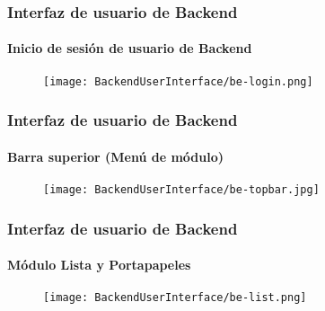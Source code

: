 
\begin{frame}[fragile]
	\frametitle{Interfaz de usuario de Backend}
	\framesubtitle{Inicio de sesión de usuario de Backend}

	\begin{figure}
		\texttt{[image: BackendUserInterface/be-login.png]}
	\end{figure}

\end{frame}


\begin{frame}[fragile]
	\frametitle{Interfaz de usuario de Backend}
	\framesubtitle{Barra superior (Menú de módulo)}

	\begin{figure}
		\texttt{[image: BackendUserInterface/be-topbar.jpg]}
	\end{figure}

\end{frame}


\begin{frame}[fragile]
	\frametitle{Interfaz de usuario de Backend}
	\framesubtitle{Módulo Lista y Portapapeles}

	\begin{figure}
		\texttt{[image: BackendUserInterface/be-list.png]}
	\end{figure}

\end{frame}

